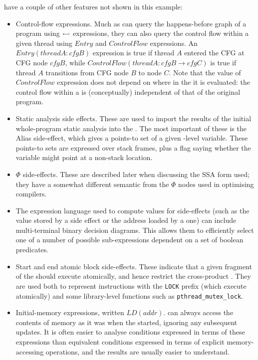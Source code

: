 \STateMachines have a couple of other features not shown in this
example:

\begin{itemize}
\item
  Control-flow expressions.  Much as \StateMachines can query the
  happens-before graph of a program using $\leftarrowtail$
  expressions, they can also query the control flow within a given
  thread using $Entry$ and $ControlFlow$ expressions.  An
  $Entry(threadA:cfgB)$ expression is true if thread $A$ entered the
  CFG at CFG node $cfgB$, while $ControlFlow(threadA:cfgB{\rightarrow}cfgC)$ is
  true if thread $A$ transitions from CFG node $B$ to node $C$.  Note
  that the value of $ControlFlow$ expression does not depend on where
  in the {\StateMachine} it is evaluated: the control flow within a
  {\StateMachine} is (conceptually) independent of that of the original
  program.
\item
  Static analysis side effects.  These are used to import the results
  of the initial whole-program static analysis into the \StateMachine.
  The most important of these is the Alias side-effect, which gives a
  points-to set of a given \StateMachine-level variable.  These
  points-to sets are expressed over stack frames, plus a flag saying
  whether the variable might point at a non-stack location.
\item
  $\Phi$ side-effects.  These are described later when discussing the
  SSA form used; they have a somewhat different semantic from the
  $\Phi$ nodes used in optimising compilers.
\item
  The expression language used to compute values for side-effects
  (such as the value stored by a  side effect or the
  address loaded by a  one) can include multi-terminal
  binary decision diagrams.
  This allows them to efficiently select one of a number of possible
  sub-expressions dependent on a set of boolean predicates.
\item
  Start and end atomic block side-effects.  These indicate that a
  given fragment of the {\StateMachine} should execute atomically, and
  hence restrict the cross-product {\StateMachine}.  They are used
  both to represent instructions with the \verb|LOCK| prefix (which
  execute atomically) and some library-level functions such as
  \verb|pthread_mutex_lock|.
\item
  Initial-memory expressions, written $LD(addr)$.  {\STateMachines}
  can always access the contents of memory as it was when the
  {\StateMachine} started, ignoring any subsequent updates.  It is
  often easier to analyse conditions expressed in terms of these
  expressions than equivalent conditions expressed in terms of
  explicit memory-accessing operations, and the results are usually
  easier to understand.


\end{itemize}
